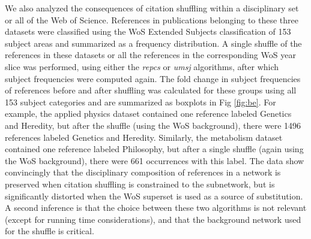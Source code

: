 \documentclass[NETN]{stjour}
\begin{document}
We also analyzed the consequences of citation shuffling within a disciplinary set or all of the Web of Science.  References in publications belonging to these three datasets were classified using the WoS Extended Subjects classification of 153 subject areas and summarized as a frequency distribution. A single shuffle of the references in these datasets or all the references in the corresponding WoS year slice was performed, using either the \emph{repcs}  or \emph{umsj} algorithms, after which subject frequencies were computed again. The fold change in subject frequencies of references before and after shuffling was calculated for these groups using all 153 subject categories and are summarized as boxplots in Fig \ref{fig:be}. 
For example, the applied physics dataset contained one reference labeled Genetics and Heredity, but after the shuffle (using the WoS background), there were 1496 references labeled Genetics and Heredity. 
Similarly,  the metabolism dataset  contained one reference labeled Philosophy, but after a single shuffle (again using the WoS background), there were   661 occurrences with this label.
The data show convincingly that the disciplinary composition of references in a network is preserved when citation shuffling is constrained to the subnetwork, but is significantly distorted when the WoS superset is used as a source of substitution. A second inference is that the choice between these two algorithms is not relevant (except for running time considerations), and that the background network used for the shuffle is critical.
\end{document}
